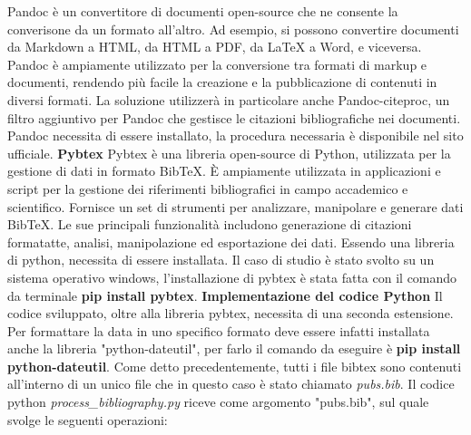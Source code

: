 \documentclass[target=bach,aauheader=]{thud}
\begin{document}
Pandoc è un convertitore di documenti open-source che ne consente la converisone da un formato all'altro. Ad esempio, si possono convertire documenti da Markdown a HTML, da HTML a PDF, da LaTeX a Word, e viceversa.
Pandoc è ampiamente utilizzato per la conversione tra formati di markup e documenti, rendendo più facile la creazione e la pubblicazione di contenuti in diversi formati.
\newline
La soluzione utilizzerà in particolare anche Pandoc-citeproc, un filtro aggiuntivo per Pandoc che gestisce le citazioni bibliografiche nei documenti.
\newline
Pandoc necessita di essere installato, la procedura necessaria è disponibile nel sito ufficiale.
\newline \newline
\textbf{{\fontsize{12}{14}\selectfont Pybtex}}
\newline \newline
Pybtex è una libreria open-source di Python, utilizzata per la gestione di dati in formato BibTeX. È ampiamente utilizzata in applicazioni e script per la gestione dei riferimenti bibliografici in campo accademico e scientifico.
\newline
Fornisce un set di strumenti per analizzare, manipolare e generare dati BibTeX. Le sue principali funzionalità includono generazione di citazioni formatatte, analisi, manipolazione ed esportazione dei dati. 
\newline
Essendo una libreria di python, necessita di essere installata. Il caso di studio è stato svolto su un sistema operativo windows, l'installazione di pybtex è stata fatta con il comando da terminale \textbf{pip install pybtex}.
\newline \newline
\textbf{{\fontsize{12}{14}\selectfont Implementazione del codice Python}}
\newline \newline
Il codice sviluppato, oltre alla libreria pybtex, necessita di una seconda estensione. Per formattare la data in uno specifico formato deve essere infatti installata anche la libreria "python-dateutil", per farlo il comando da eseguire è \textbf{pip install python-dateutil}.
\newline
Come detto precedentemente, tutti i file bibtex sono contenuti all'interno di un unico file che in questo caso è stato chiamato \textit{pubs.bib}. Il codice python \textit{process\_bibliography.py} riceve come argomento "pubs.bib", sul quale svolge le seguenti operazioni:
\end{document}

